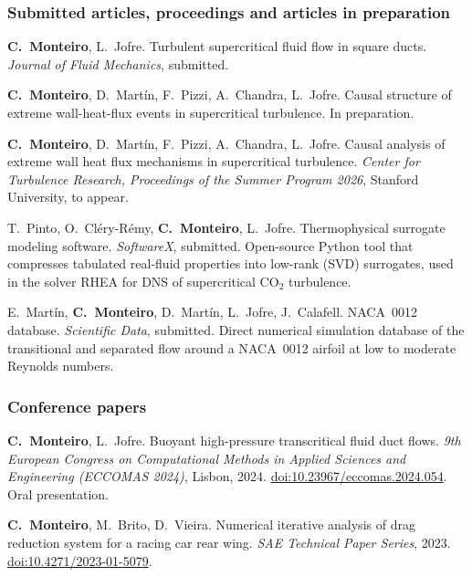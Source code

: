 \documentclass[11pt]{article}
\newcommand{\NEW}[1]{\iffinal #1\else{\color{red}#1}\fi} %
\begin{document}
\subsubsection*{Submitted articles, proceedings and articles in preparation}
\begin{enumerate}[label={[R\arabic*]}, itemsep=0pt]
  \item \hypertarget{pub-R1}{}\textbf{C.\ Monteiro}, L.\ Jofre. Turbulent supercritical fluid flow in
  square ducts. \emph{Journal of Fluid Mechanics}, submitted.
  \item \hypertarget{pub-R2}{}\textbf{C.\ Monteiro}, D.\ Mart\'in, F.\ Pizzi, A.\ Chandra, L.\ Jofre. Causal structure of extreme
  wall-heat-flux events in supercritical turbulence. In preparation.
  \item \hypertarget{pub-R3}{}\textbf{C.\ Monteiro}, D.\ Mart\'in, F.\ Pizzi, A.\ Chandra, L.\ Jofre.
  Causal analysis of extreme wall heat flux mechanisms in supercritical turbulence.
  \emph{Center for Turbulence Research, Proceedings of the Summer Program 2026}, Stanford
  University, to appear.
  \item \hypertarget{pub-R4}{}T.\ Pinto, O.\ Cl\'ery-R\'emy, \textbf{C.\ Monteiro}, L.\ Jofre.
  Thermophysical surrogate modeling software. \emph{SoftwareX}, submitted. Open-source
  Python tool that compresses tabulated real-fluid properties into low-rank (SVD)
  surrogates, used in the solver RHEA for DNS of supercritical CO$_2$ turbulence.
  \item \hypertarget{pub-R5}{}E.\ Mart\'in, \textbf{C.\ Monteiro}, D.\ Mart\'in, L.\ Jofre,
  J.\ Calafell. \NEW{NACA~0012} database. \emph{Scientific Data}, submitted. Direct numerical
  simulation database of the transitional and separated flow around a NACA~0012 airfoil at
  low to moderate Reynolds numbers.
\end{enumerate}

\subsubsection*{Conference papers}
\begin{enumerate}[label={[C\arabic*]}, itemsep=0pt]
  \item \hypertarget{pub-C1}{}\textbf{C.\ Monteiro}, L.\ Jofre. Buoyant high-pressure transcritical fluid duct
  flows. \emph{9th European Congress on Computational Methods in Applied Sciences and
  Engineering (ECCOMAS 2024)}, Lisbon, 2024.
  \href{https://doi.org/10.23967/eccomas.2024.054}{doi:10.23967/eccomas.2024.054}. Oral presentation.
  \item \hypertarget{pub-C2}{}\textbf{C.\ Monteiro}, M.\ Brito, D.\ Vieira. Numerical iterative analysis of drag
  reduction system for a racing car rear wing. \emph{SAE Technical Paper Series}, 2023.
  \href{https://doi.org/10.4271/2023-01-5079}{doi:10.4271/2023-01-5079}.
\end{enumerate}
\end{document}
